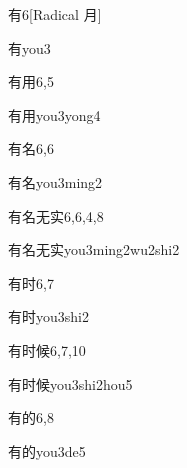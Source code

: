 \begin{entry}{有}{6}[Radical 月]
  \begin{phonetics}{有}{you3}
  \end{phonetics}
\end{entry}

\begin{entry}{有用}{6,5}
  \begin{phonetics}{有用}{you3yong4}
  \end{phonetics}
\end{entry}

\begin{entry}{有名}{6,6}
  \begin{phonetics}{有名}{you3ming2}
  \end{phonetics}
\end{entry}

\begin{entry}{有名无实}{6,6,4,8}
  \begin{phonetics}{有名无实}{you3ming2wu2shi2}
  \end{phonetics}
\end{entry}

\begin{entry}{有时}{6,7}
  \begin{phonetics}{有时}{you3shi2}
  \end{phonetics}
\end{entry}

\begin{entry}{有时候}{6,7,10}
  \begin{phonetics}{有时候}{you3shi2hou5}
  \end{phonetics}
\end{entry}

\begin{entry}{有的}{6,8}
  \begin{phonetics}{有的}{you3de5}
  \end{phonetics}
\end{entry}


